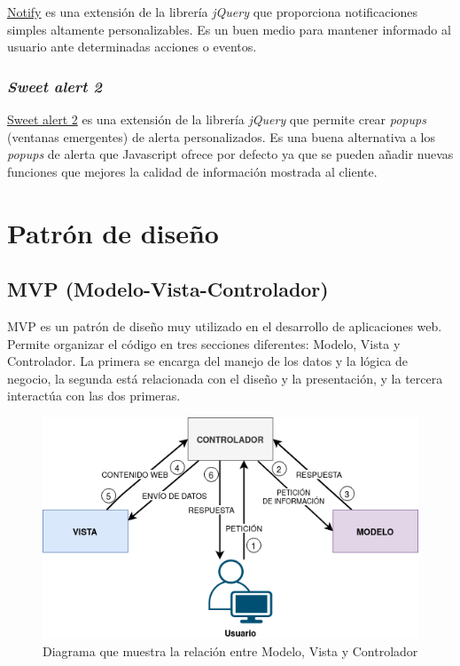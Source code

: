 \documentclass[
]{article}
\begin{document}
\href{https://notifyjs.jpillora.com/}{Notify} es una extensión de la
librería \emph{jQuery} que proporciona notificaciones simples altamente
personalizables. Es un buen medio para mantener informado al usuario
ante determinadas acciones o eventos.

\hypertarget{sweet-alert-2}{%
\subsubsection{\texorpdfstring{\emph{Sweet alert
2}}{Sweet alert 2}}\label{sweet-alert-2}}

\href{https://github.com/sweetalert2/sweetalert2}{Sweet alert 2} es una
extensión de la librería \emph{jQuery} que permite crear \emph{popups}
(ventanas emergentes) de alerta personalizados. Es una buena alternativa
a los \emph{popups} de alerta que Javascript ofrece por defecto ya que
se pueden añadir nuevas funciones que mejores la calidad de información
mostrada al cliente.

\hypertarget{patruxf3n-de-diseuxf1o}{%
\section{Patrón de diseño}\label{patruxf3n-de-diseuxf1o}}

\hypertarget{mvp-modelo-vista-controlador}{%
\subsection{MVP
(Modelo-Vista-Controlador)}\label{mvp-modelo-vista-controlador}}

MVP es un patrón de diseño muy utilizado en el desarrollo de
aplicaciones web. Permite organizar el código en tres secciones
diferentes: Modelo, Vista y Controlador. La primera se encarga del
manejo de los datos y la lógica de negocio, la segunda está relacionada
con el diseño y la presentación, y la tercera interactúa con las dos
primeras.

\begin{figure}
\hypertarget{mvc}{%
\centering
\includegraphics{../_static/images/mvc.png}
\caption{Diagrama que muestra la relación entre Modelo, Vista y
Controlador}\label{mvc}
}
\end{figure}
\end{document}
